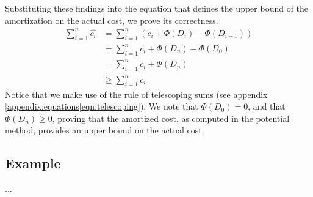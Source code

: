 Substituting these findings into the equation that defines the upper bound of
the amortization on the actual cost, we prove its correctness.
\begin{align}
	\sum_{i=1}^{n}{\hat{c_i}}
	&= \sum_{i=1}^{n}{(c_i + \Phi(D_i) - \Phi(D_{i-1}))} \\
	&= \sum_{i=1}^{n}{c_i + \Phi(D_n) - \Phi(D_{0})} \\
	&= \sum_{i=1}^{n}{c_i + \Phi(D_n)} \\
	&\geq \sum_{i=1}^{n}{c_i}
\end{align}
Notice that we make use of the rule of telescoping sums (see appendix
\ref{appendix:equations|eqn:telescoping}). We note that $\Phi(D_0) = 0$,
and that $\Phi(D_n) \geq 0$, proving that the amortized cost, as computed in
the potential method, provides an upper bound on the actual cost.

\subsection{Example}
...

